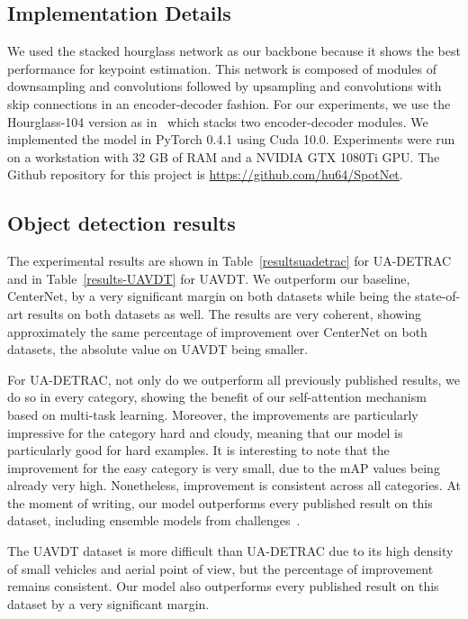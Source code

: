 \documentclass[10pt, conference, compsocconf]{IEEEtran}
\begin{document}
\subsection{Implementation Details}

We used the stacked hourglass network as our backbone because it shows the best performance for keypoint estimation. This network is composed of modules of downsampling and convolutions followed by upsampling and convolutions with skip connections in an encoder-decoder fashion. For our experiments, we use the Hourglass-104 version as in~\cite{law2018cornernet} which stacks two encoder-decoder modules. We implemented the model in PyTorch 0.4.1 using Cuda 10.0. Experiments were run on a workstation with 32 GB of RAM and a NVIDIA GTX 1080Ti GPU. The Github repository for this project is \url{https://github.com/hu64/SpotNet}.

\subsection{Object detection results}

The experimental results are shown in Table~\ref{resultsuadetrac} for UA-DETRAC and in Table~\ref{results-UAVDT} for UAVDT. We outperform our baseline, CenterNet, by a very significant margin on both datasets while being the state-of-art results on both datasets as well. The results are very coherent, showing approximately the same percentage of improvement over CenterNet on both datasets, the absolute value on UAVDT being smaller.  

For UA-DETRAC, not only do we outperform all previously published results, we do so in every category, showing the benefit of our self-attention mechanism based on multi-task learning. Moreover, the improvements are particularly impressive for the category hard and cloudy, meaning that our model is particularly good for hard examples. It is interesting to note that the improvement for the easy category is very small, due to the mAP values being already very high. Nonetheless, improvement is consistent across all categories. At the moment of writing, our model outperforms every published result on this dataset, including ensemble models from challenges~\cite{lyu2018ua}.

The UAVDT dataset is more difficult than UA-DETRAC due to its high density of small vehicles and aerial point of view, but the percentage of improvement remains consistent. Our model also outperforms every published result on this dataset by a very significant margin. 
\end{document}
